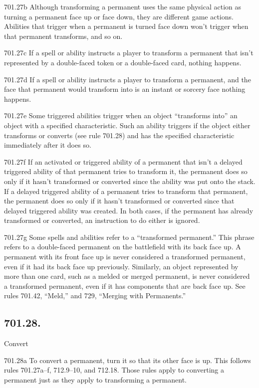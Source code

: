 701.27b Although transforming a permanent uses the same physical action as turning a permanent face up or face down, they are different game actions. Abilities that trigger when a permanent is turned face down won’t trigger when that permanent transforms, and so on.

701.27c If a spell or ability instructs a player to transform a permanent that isn’t represented by a double-faced token or a double-faced card, nothing happens.

701.27d If a spell or ability instructs a player to transform a permanent, and the face that permanent would transform into is an instant or sorcery face nothing happens.

701.27e Some triggered abilities trigger when an object “transforms into” an object with a specified characteristic. Such an ability triggers if the object either transforms or converts (see rule 701.28) and has the specified characteristic immediately after it does so.

701.27f If an activated or triggered ability of a permanent that isn’t a delayed triggered ability of that permanent tries to transform it, the permanent does so only if it hasn’t transformed or converted since the ability was put onto the stack. If a delayed triggered ability of a permanent tries to transform that permanent, the permanent does so only if it hasn’t transformed or converted since that delayed triggered ability was created. In both cases, if the permanent has already transformed or converted, an instruction to do either is ignored.

701.27g Some spells and abilities refer to a “transformed permanent.” This phrase refers to a double-faced permanent on the battlefield with its back face up. A permanent with its front face up is never considered a transformed permanent, even if it had its back face up previously. Similarly, an object represented by more than one card, such as a melded or merged permanent, is never considered a transformed permanent, even if it has components that are back face up. See rules 701.42, “Meld,” and 729, “Merging with Permanents.”

\subsection*{701.28.}
Convert

701.28a To convert a permanent, turn it so that its other face is up. This follows rules 701.27a–f, 712.9–10, and 712.18. Those rules apply to converting a permanent just as they apply to transforming a permanent.

